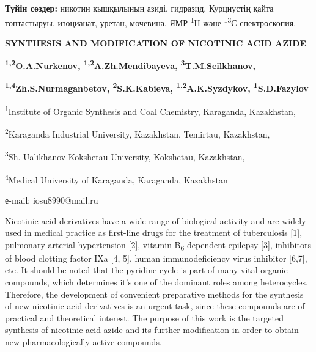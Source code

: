 {\bfseries Түйін сөздер:} никотин қышқылының азиді, гидразид, Курциустің
қайта топтастыруы, изоцианат, уретан, мочевина, ЯМР \textsuperscript{1}Н
және \textsuperscript{13}С спектроскопия.

\begin{center}
{\large\bfseries SYNTHESIS AND MODIFICATION OF NICOTINIC ACID AZIDE}

{\bfseries \textsuperscript{1,2}O.A.Nurkenov,
\textsuperscript{1,2}A.Zh.Mendibayeva,
\textsuperscript{3}T.M.Seilkhanov,}

{\bfseries \textsuperscript{1,4}Zh.S.Nurmaganbetov,
\textsuperscript{2}S.K.Kabieva, \textsuperscript{1,2}A.K.Syzdykov,
\textsuperscript{1}S.D.Fazylov}

\textsuperscript{1}Institute of Organic Synthesis and Coal Chemistry,
Karaganda, Kazakhstan,

\textsuperscript{2}Karaganda Industrial University, Kazakhstan,
Temirtau, Kazakhstan,

\textsuperscript{3}Sh. Ualikhanov Kokshetau University, Kokshetau,
Kazakhstan,

\textsuperscript{4}Medical University of Karaganda, Karaganda,
Kazakhstan

е-mail: iosu8990@mail.ru
\end{center}

Nicotinic acid derivatives have a wide range of biological activity and
are widely used in medical practice as first-line drugs for the
treatment of tuberculosis {[}1{]}, pulmonary arterial hypertension
{[}2{]}, vitamin B\textsubscript{6}-dependent epilepsy {[}3{]},
inhibitors of blood clotting factor IXa {[}4, 5{]}, human
immunodeficiency virus inhibitor {[}6,7{]}, etc. It should be noted that
the pyridine cycle is part of many vital organic compounds, which
determines it's one of the dominant roles among heterocycles. Therefore,
the development of convenient preparative methods for the synthesis of
new nicotinic acid derivatives is an urgent task, since these compounds
are of practical and theoretical interest. The purpose of this work is
the targeted synthesis of nicotinic acid azide and its further
modification in order to obtain new pharmacologically active compounds.

